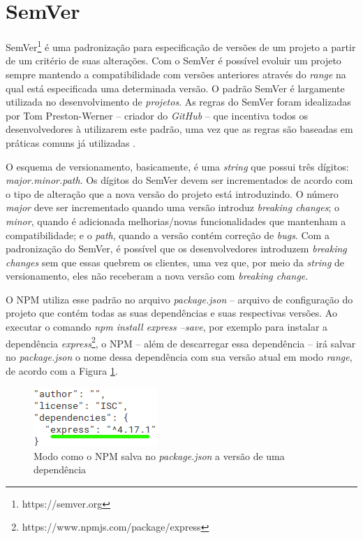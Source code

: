 \section{\gls{SemVer}}
\label{ref-teo:semver}
\gls{SemVer}\footnote{https://semver.org} é uma padronização para especificação de versões de um projeto a partir de um critério de suas alterações. Com o \gls{SemVer} é possível evoluir um projeto sempre mantendo a compatibilidade com versões anteriores através do \textit{range} na qual está especificada uma determinada versão. 
O padrão \gls{SemVer} é largamente utilizada no desenvolvimento de \textit{projetos}. As regras do \gls{SemVer} foram idealizadas por Tom Preston-Werner -- criador do \textit{GitHub} -- que incentiva todos os desenvolvedores à utilizarem este padrão, uma vez que as regras são baseadas em práticas comuns já utilizadas \cite{teorical_reference:semver}.

O esquema de versionamento, basicamente, é uma \textit{string} que possui três dígitos: \textit{major.minor.path}. Os dígitos do \gls{SemVer} devem ser incrementados de acordo com o tipo de alteração que a nova versão do projeto está introduzindo. O número \textit{major} deve ser incrementado quando uma versão introduz \textit{breaking changes}; o \textit{minor}, quando é adicionada melhorias/novas funcionalidades que mantenham a compatibilidade; e o \textit{path}, quando a versão contém correção de \textit{bugs}. Com a padronização do \gls{SemVer}, é possível que os desenvolvedores introduzem \textit{breaking changes} sem que essas quebrem os clientes, uma vez que, por meio da \textit{string} de versionamento, eles não receberam a nova versão com \textit{breaking change}.

O \gls{NPM} utiliza esse padrão no arquivo \textit{package.json} -- arquivo de configuração do projeto que contém todas as suas dependências e suas respectivas versões. Ao executar o comando \textit{npm install express --save}, por exemplo para instalar a dependência \textit{express}\footnote{https://www.npmjs.com/package/express}, o \gls{NPM} -- além de descarregar essa dependência -- irá salvar no \textit{package.json} o nome dessa dependência com sua versão atual em modo \textit{range}, de acordo com a Figura \ref{fig:dep_express}.

\begin{figure}
    \centering
    \includegraphics{figuras/dependencies_express.png}
    \caption{Modo como o \gls{NPM} salva no \textit{package.json} a versão de uma dependência}
    \label{fig:dep_express}
\end{figure}{}

